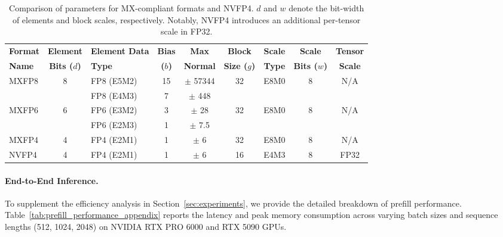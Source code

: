 \documentclass[11pt]{article}
\begin{document}
\begin{table}[t]
\centering
\caption{Comparison of parameters for MX-compliant formats and NVFP4. $d$ and $w$ denote the bit-width of elements and block scales, respectively. Notably, NVFP4 introduces an additional per-tensor scale in FP32.}
\label{tab:formats}
\begin{tabular}{l|c|l|c|c|c|c|c|c}
\toprule
\textbf{Format} & \textbf{Element} & \textbf{Element Data} & \textbf{Bias} & \textbf{Max} & \textbf{Block} & \textbf{Scale} & \textbf{Scale} & \textbf{Tensor} \\
\textbf{Name} & \textbf{Bits ($d$)} & \textbf{Type} & \textbf{($b$)} & \textbf{Normal} & \textbf{Size ($g$)} & \textbf{Type} & \textbf{Bits ($w$)} & \textbf{Scale} \\
\midrule
\multirow{2}{*}{MXFP8} & \multirow{2}{*}{8} & FP8 (E5M2) & 15 & $\pm$ 57344 & \multirow{2}{*}{32} & \multirow{2}{*}{E8M0} & \multirow{2}{*}{8} & \multirow{2}{*}{N/A} \\
                       &                    & FP8 (E4M3) & 7  & $\pm$ 448   &                     &                       &                    &                      \\
\midrule
\multirow{2}{*}{MXFP6} & \multirow{2}{*}{6} & FP6 (E3M2) & 3  & $\pm$ 28    & \multirow{2}{*}{32} & \multirow{2}{*}{E8M0} & \multirow{2}{*}{8} & \multirow{2}{*}{N/A} \\
                       &                    & FP6 (E2M3) & 1  & $\pm$ 7.5   &                     &                       &                    &                      \\
\midrule
MXFP4                  & 4                  & FP4 (E2M1) & 1  & $\pm$ 6     & 32                  & E8M0                  & 8                  & N/A                  \\
\midrule
NVFP4         & 4                  & FP4 (E2M1) & 1  & $\pm$ 6     & 16                  & E4M3                  & 8                  & FP32        \\
\bottomrule
\end{tabular}
\end{table}

\paragraph{End-to-End Inference.}
To supplement the efficiency analysis in Section~\ref{sec:experiments}, we provide the detailed breakdown of prefill performance. 
Table~\ref{tab:prefill_performance_appendix} reports the latency and peak memory consumption across varying batch sizes and sequence lengths (512, 1024, 2048) on NVIDIA RTX PRO 6000 and RTX 5090 GPUs.
\end{document}
